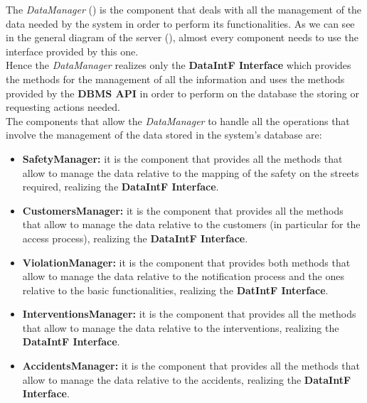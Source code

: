 			The \emph{DataManager} () is the component that deals with all the management of the data needed by the system in order to perform its functionalities. As we can see in the general diagram of the server (), almost every component needs to use the interface provided by this one.\\
			
			Hence the \emph{DataManager} realizes only the \textbf{DataIntF Interface} which provides the methods for the management of all the information and uses the methods provided by the \textbf{DBMS API} in order to perform on the database the storing or requesting actions needed.\\
			
			The components that allow the \emph{DataManager} to handle all the operations that involve the management of the data stored in the system's database are:
			
			\begin{itemize}
				\item \textbf{SafetyManager:} it is the component that provides all the methods that allow to manage the data relative to the mapping of the safety on the streets required, realizing the \textbf{DataIntF Interface}.
				
				\item \textbf{CustomersManager:} it is the component that provides all the methods that allow to manage the data relative to the customers (in particular for the access process), realizing the \textbf{DataIntF Interface}. 
				
				\item \textbf{ViolationManager:} it is the component that provides both methods that allow to manage the data relative to the notification process and the ones relative to the basic functionalities, realizing the \textbf{DatIntF Interface}.
				
				\item \textbf{InterventionsManager:} it is the component that provides all the methods that allow to manage the data relative to the interventions, realizing the \textbf{DataIntF Interface}.
				
				\item \textbf{AccidentsManager:} it is the component that provides all the methods that allow to manage the data relative to the accidents, realizing the \textbf{DataIntF Interface}.
			\end{itemize}
		

